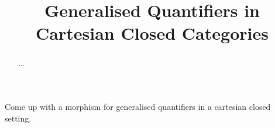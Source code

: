\documentclass[a4paper,11pt]{llncs}
\title{Generalised Quantifiers in Cartesian Closed Categories}
\author{}
\institute{}
\begin{document}
\maketitle




\begin{abstract}
...
\end{abstract}

Come up with a morphism for  generalised quantifiers in a cartesian closed setting. 




\end{document}
